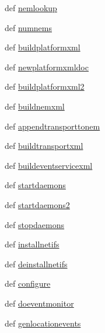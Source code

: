 \begin{DoxyCompactItemize}
\item 
def \hyperlink{classcore_1_1emane_1_1emane_1_1_emane_a4c69c431ff4075770a204e4ade72a7e9}{nemlookup}
\item 
def \hyperlink{classcore_1_1emane_1_1emane_1_1_emane_a0172baaf21ae1b2ae00e40710992dfbb}{numnems}
\item 
def \hyperlink{classcore_1_1emane_1_1emane_1_1_emane_ad4a3cea4723a9ee8e38259f479c8037b}{buildplatformxml}
\item 
def \hyperlink{classcore_1_1emane_1_1emane_1_1_emane_adddbecc27ea4e3449cbaadf2d5832362}{newplatformxmldoc}
\item 
def \hyperlink{classcore_1_1emane_1_1emane_1_1_emane_a53f50c4267c015dd2947fe935c1d0540}{buildplatformxml2}
\item 
def \hyperlink{classcore_1_1emane_1_1emane_1_1_emane_a7e85cad6a8141ff861adaa45da330f09}{buildnemxml}
\item 
def \hyperlink{classcore_1_1emane_1_1emane_1_1_emane_a29d4d78d53e9ba9dead5076a5efb7980}{appendtransporttonem}
\item 
def \hyperlink{classcore_1_1emane_1_1emane_1_1_emane_ac684cda57e53fcd7bc5396a14c8dbe35}{buildtransportxml}
\item 
def \hyperlink{classcore_1_1emane_1_1emane_1_1_emane_ae8e88d392329f6ebfccdffc68ec6f988}{buildeventservicexml}
\item 
def \hyperlink{classcore_1_1emane_1_1emane_1_1_emane_a105e392143984a3c0834c1d6d5c7ce9c}{startdaemons}
\item 
def \hyperlink{classcore_1_1emane_1_1emane_1_1_emane_afe45b59253f23dfab40f7026c53d54d1}{startdaemons2}
\item 
def \hyperlink{classcore_1_1emane_1_1emane_1_1_emane_a5eb23f2a733c482441efa8efb1f0e0c8}{stopdaemons}
\item 
def \hyperlink{classcore_1_1emane_1_1emane_1_1_emane_a314acce42daea811c5d05c8d2f4586da}{installnetifs}
\item 
def \hyperlink{classcore_1_1emane_1_1emane_1_1_emane_ac535a2e8d96aae912c3df17f9b07a334}{deinstallnetifs}
\item 
def \hyperlink{classcore_1_1emane_1_1emane_1_1_emane_a193ffb8f656b40c065a27e75c98ed9b2}{configure}
\item 
def \hyperlink{classcore_1_1emane_1_1emane_1_1_emane_a154c10aec520c11d414d97c3c0c77d74}{doeventmonitor}
\item 
def \hyperlink{classcore_1_1emane_1_1emane_1_1_emane_a862c6a9cf11358d1d0582c7b7ed49a36}{genlocationevents}
\item 

\end{DoxyCompactItemize}
